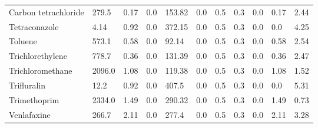 \begin{tabular}{lllllllllll}
\cline{1-11}
Carbon tetrachloride & 279.5 & 0.17 & 0.0 & 153.82 & 0.0 & 0.5 & 0.3 & 0.0 & 0.17 & 2.44 \\
\cline{1-11}
Tetraconazole & 4.14 & 0.92 & 0.0 & 372.15 & 0.0 & 0.5 & 0.3 & 0.0 & 0.0 & 4.25 \\
\cline{1-11}
Toluene & 573.1 & 0.58 & 0.0 & 92.14 & 0.0 & 0.5 & 0.3 & 0.0 & 0.58 & 2.54 \\
\cline{1-11}
Trichlorethylene & 778.7 & 0.36 & 0.0 & 131.39 & 0.0 & 0.5 & 0.3 & 0.0 & 0.36 & 2.47 \\
\cline{1-11}
Trichloromethane & 2096.0 & 1.08 & 0.0 & 119.38 & 0.0 & 0.5 & 0.3 & 0.0 & 1.08 & 1.52 \\
\cline{1-11}
Trifluralin & 12.2 & 0.92 & 0.0 & 407.5 & 0.0 & 0.5 & 0.3 & 0.0 & 0.0 & 5.31 \\
\cline{1-11}
Trimethoprim & 2334.0 & 1.49 & 0.0 & 290.32 & 0.0 & 0.5 & 0.3 & 0.0 & 1.49 & 0.73 \\
\cline{1-11}
Venlafaxine & 266.7 & 2.11 & 0.0 & 277.4 & 0.0 & 0.5 & 0.3 & 0.0 & 2.11 & 3.28 \\
\cline{1-11}
\end{tabular}
